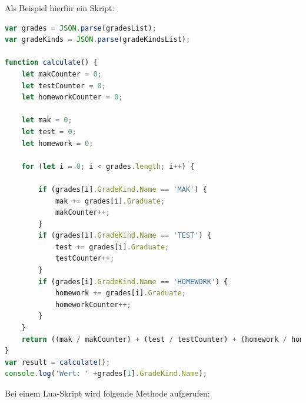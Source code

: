 \newpage
Als Beispiel hierfür ein Skript:
\begin{lstlisting}[language={JavaScript},caption=Javascript-Skript,label=lst:impl:jstest]
var grades = JSON.parse(gradesList);
var gradeKinds = JSON.parse(gradeKindsList);

function calculate() {
    let makCounter = 0;
    let testCounter = 0;
    let homeworkCounter = 0;

    let mak = 0;
    let test = 0;
    let homework = 0;

    for (let i = 0; i < grades.length; i++) {

        if (grades[i].GradeKind.Name == 'MAK') {
            mak += grades[i].Graduate;
            makCounter++;
        }
        if (grades[i].GradeKind.Name == 'TEST') {
            test += grades[i].Graduate;
            testCounter++;
        }
        if (grades[i].GradeKind.Name == 'HOMEWORK') {
            homework += grades[i].Graduate;
            homeworkCounter++;
        }
    }
    return ((mak / makCounter) + (test / testCounter) + (homework / homeworkCounter)) / 3;
}
var result = calculate();
console.log('Wert: ' +grades[1].GradeKind.Name);
\end{lstlisting}


\newpage
Bei einem Lua-Skript wird folgende Methode aufgerufen:

